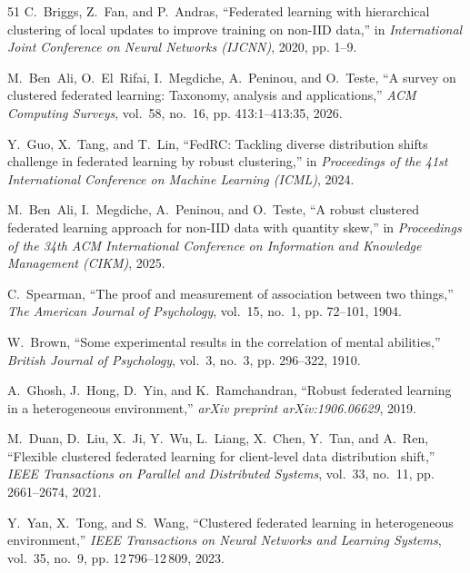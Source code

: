 \documentclass[journal]{IEEEtran}
\theoremstyle{definition}
\begin{document}
\begin{thebibliography}{51}
C.~Briggs, Z.~Fan, and P.~Andras, ``Federated learning with hierarchical
  clustering of local updates to improve training on non-{IID} data,'' in
  \emph{International Joint Conference on Neural Networks (IJCNN)}, 2020, pp.
  1--9.

M.~Ben~Ali, O.~El~Rifai, I.~Megdiche, A.~Peninou, and O.~Teste, ``A survey on
  clustered federated learning: Taxonomy, analysis and applications,''
  \emph{ACM Computing Surveys}, vol.~58, no.~16, pp. 413:1--413:35, 2026.

Y.~Guo, X.~Tang, and T.~Lin, ``{FedRC}: Tackling diverse distribution shifts
  challenge in federated learning by robust clustering,'' in \emph{Proceedings
  of the 41st International Conference on Machine Learning (ICML)}, 2024.

M.~Ben~Ali, I.~Megdiche, A.~Peninou, and O.~Teste, ``A robust clustered
  federated learning approach for non-{IID} data with quantity skew,'' in
  \emph{Proceedings of the 34th ACM International Conference on Information and
  Knowledge Management (CIKM)}, 2025.

C.~Spearman, ``The proof and measurement of association between two things,''
  \emph{The American Journal of Psychology}, vol.~15, no.~1, pp. 72--101, 1904.

W.~Brown, ``Some experimental results in the correlation of mental abilities,''
  \emph{British Journal of Psychology}, vol.~3, no.~3, pp. 296--322, 1910.

A.~Ghosh, J.~Hong, D.~Yin, and K.~Ramchandran, ``Robust federated learning in a
  heterogeneous environment,'' \emph{arXiv preprint arXiv:1906.06629}, 2019.

M.~Duan, D.~Liu, X.~Ji, Y.~Wu, L.~Liang, X.~Chen, Y.~Tan, and A.~Ren,
  ``Flexible clustered federated learning for client-level data distribution
  shift,'' \emph{IEEE Transactions on Parallel and Distributed Systems},
  vol.~33, no.~11, pp. 2661--2674, 2021.

Y.~Yan, X.~Tong, and S.~Wang, ``Clustered federated learning in heterogeneous
  environment,'' \emph{IEEE Transactions on Neural Networks and Learning
  Systems}, vol.~35, no.~9, pp. 12\,796--12\,809, 2023.


\end{thebibliography}
\end{document}
